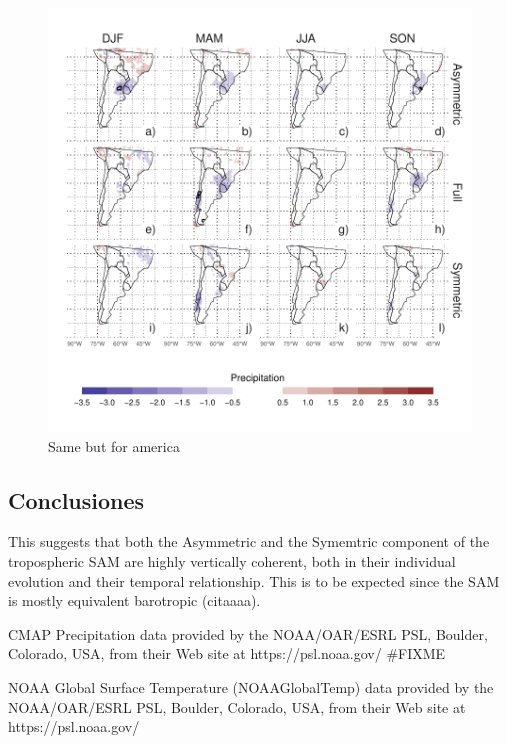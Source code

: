 \documentclass[twocol]{ametsocV5}
\begin{document}
\begin{figure}
\includegraphics{pp-regr-global-america-1} \caption[Same but for america]{Same but for america}\label{fig:pp-regr-global-america}
\end{figure}

\subsection{Conclusiones}

This suggests that both the Asymmetric and the Symemtric component of
the tropospheric SAM are highly vertically coherent, both in their
individual evolution and their temporal relationship. This is to be
expected since the SAM is mostly equivalent barotropic (citaaaa).

\acknowledgments

CMAP Precipitation data provided by the NOAA/OAR/ESRL PSL, Boulder,
Colorado, USA, from their Web site at https://psl.noaa.gov/ \#FIXME

NOAA Global Surface Temperature (NOAAGlobalTemp) data provided by the
NOAA/OAR/ESRL PSL, Boulder, Colorado, USA, from their Web site at
https://psl.noaa.gov/



\newpage

\appendix
\end{document}
